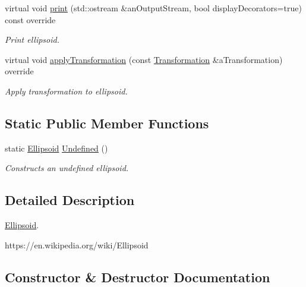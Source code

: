 \begin{DoxyCompactItemize}
virtual void \hyperlink{classlibrary_1_1math_1_1geom_1_1d3_1_1objects_1_1_ellipsoid_af912ba3948bd06ac517c727210082df3}{print} (std\+::ostream \&an\+Output\+Stream, bool display\+Decorators=true) const override
\begin{DoxyCompactList}\small\item\em Print ellipsoid. \end{DoxyCompactList}\item 
virtual void \hyperlink{classlibrary_1_1math_1_1geom_1_1d3_1_1objects_1_1_ellipsoid_a101408b676b518c0270ebabc55f288d2}{apply\+Transformation} (const \hyperlink{classlibrary_1_1math_1_1geom_1_1d3_1_1_transformation}{Transformation} \&a\+Transformation) override
\begin{DoxyCompactList}\small\item\em Apply transformation to ellipsoid. \end{DoxyCompactList}\end{DoxyCompactItemize}
\subsection*{Static Public Member Functions}
\begin{DoxyCompactItemize}
\item 
static \hyperlink{classlibrary_1_1math_1_1geom_1_1d3_1_1objects_1_1_ellipsoid}{Ellipsoid} \hyperlink{classlibrary_1_1math_1_1geom_1_1d3_1_1objects_1_1_ellipsoid_affcef36f736e6d21a0246a149b8fb688}{Undefined} ()
\begin{DoxyCompactList}\small\item\em Constructs an undefined ellipsoid. \end{DoxyCompactList}\end{DoxyCompactItemize}


\subsection{Detailed Description}
\hyperlink{classlibrary_1_1math_1_1geom_1_1d3_1_1objects_1_1_ellipsoid}{Ellipsoid}. 

https\+://en.wikipedia.\+org/wiki/\+Ellipsoid 

\subsection{Constructor \& Destructor Documentation}
\mbox{\label{classlibrary_1_1math_1_1geom_1_1d3_1_1objects_1_1_ellipsoid_aae81fe0edc7f0e8d4590ea89ae73cb14}} 
